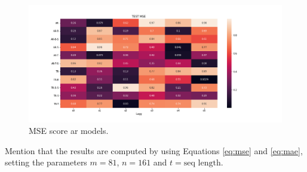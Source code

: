 \begin{table}[h]
    \centering
    \caption{Configuration of \acrshort{ar}-models. $\times$ denoted not applied, \checked denotes applied. \textbf{Bruk denne for tre eksempler, gjør de mer ulike, velg gjerne best ++ .}}
    \label{tab:ar_model_config}
\end{table}

\begin{figure}
    \centering
    \includegraphics[scale = 0.5]{python_figs/MSE_score_AR_models.png} %
    \caption{MSE score ar models.}
    \label{fig:results_ar_models}
\end{figure}

Mention that the results are computed by using Equations \eqref{eq:mse} and \eqref{eq:mae}, setting the parameters $m = 81$, $n=161$ and $t=\text{seq length}$. 

